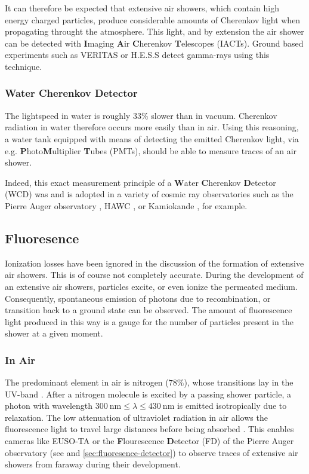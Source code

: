 It can therefore be expected that extensive air showers, which contain high energy charged particles, produce considerable amounts of Cherenkov light when 
propagating throught the atmosphere. This light, and by extension the air shower can be detected with \textbf{I}maging \textbf{A}ir \textbf{C}herenkov 
\textbf{T}elescopes (IACTs). Ground based experiments such as VERITAS \cite{VeritasTelescope} or H.E.S.S \cite{HessTelescope} detect gamma-rays using this technique.

\subsubsection{Water Cherenkov Detector}

The lightspeed in water is roughly $33\%$ slower than in vacuum. Cherenkov radiation in water therefore occurs more easily than in air. Using this reasoning, a 
water tank equipped with means of detecting the emitted Cherenkov light, via e.g. \textbf{P}hoto\textbf{M}ultiplier \textbf{T}ubes (PMTs), should be able to 
measure traces of an air shower. 

Indeed, this exact measurement principle of a \textbf{W}ater \textbf{C}herenkov \textbf{D}etector (WCD) was and is adopted in a variety of cosmic ray observatories 
such as the Pierre Auger observatory \cite{PierreAugerObservatory}, HAWC \cite{HAWC}, or Kamiokande \cite{Kamiokande}, for example.


\subsection{Fluoresence}
\label{ssec:fluoresence}

Ionization losses have been ignored in the discussion of the formation of extensive air showers. This is of course not completely accurate. During the development of 
an extensive air showers, particles excite, or even ionize the permeated medium. Consequently, spontaneous emission of photons due to recombination, or transition 
back to a ground state can be observed. The amount of fluorescence light produced in this way is a gauge for the number of particles present in the shower at a given
moment.

\subsubsection{In Air}

The predominant element in air is nitrogen ($78\%$), whose transitions lay in the UV-band \cite{FDReconstruction}. After a nitrogen molecule is excited by a passing
shower particle, a photon with wavelength $\SI{300}{\nano\meter} \leq \lambda \leq \SI{430}{\nano\meter}$ is emitted isotropically due to relaxation. The low 
attenuation of ultraviolet radiation in air allows the fluorescence light to travel large distances before being absorbed \cite{elterman1968uv}. This enables 
cameras like EUSO-TA \cite{abdellaoui2018euso} or the \textbf{F}lourescence \textbf{D}etector (FD) of the Pierre Auger observatory (see \cite{FDReconstruction} and
\autoref{sec:fluoresence-detector}) to observe traces of extensive air showers from faraway during their development. 

